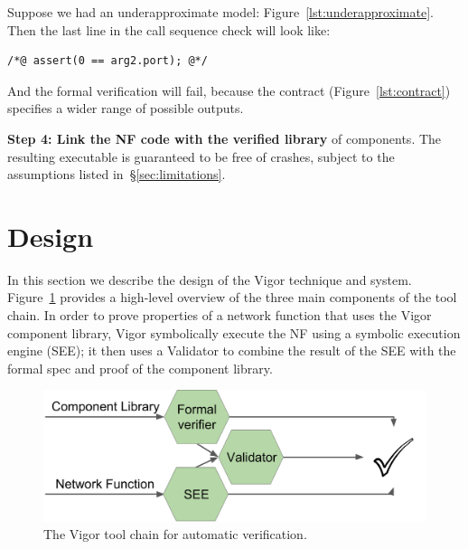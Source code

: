 \documentclass[letterpaper,twocolumn,10pt]{article}
\newcommand{\code}[1]{\lstinline{#1}}
\begin{document}
Suppose we had an underapproximate model: Figure~\ref{lst:underapproximate}.
Then the last line in the call sequence check will look like:
\begin{lstlisting}
/*@ assert(0 == arg2.port); @*/
\end{lstlisting}
And the formal verification will fail, because the contract
(Figure~\ref{lst:contract}) specifies a wider range of possible outputs.

{\bf Step 4: Link the NF code with the verified library} of components. The
resulting executable is guaranteed to be free of crashes, subject to the
assumptions listed in~\S\ref{sec:limitations}.



\section{Design}
\label{sec:design}

In this section we describe the design of the Vigor technique and system.
Figure~\ref{fig:arch} provides a high-level overview of the three main
components of the tool chain. In order to prove properties of a network function
that uses the Vigor component library, Vigor symbolically execute the NF using a
symbolic execution engine (SEE); it then uses a Validator to combine the result
of the SEE with the formal spec and proof of the component library.

\begin{figure}[h!]
    \includegraphics[width=\columnwidth]{figures/impl_overview.png}
    \caption{The Vigor tool chain for automatic verification.}
    \label{fig:arch}
\end{figure}
\end{document}
